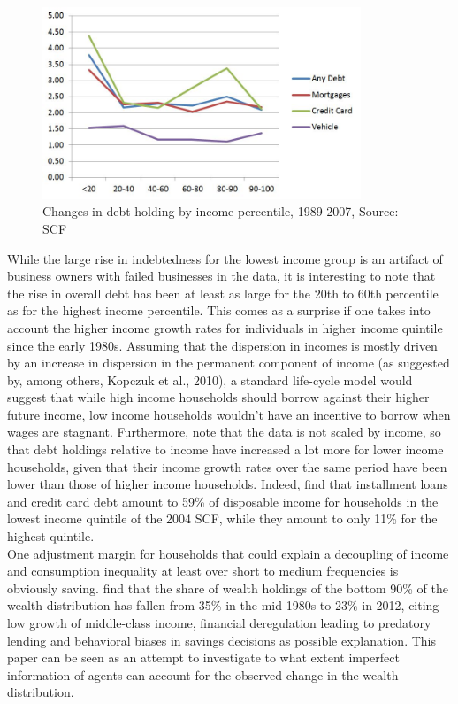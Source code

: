 \begin{figure}[ht]
	\centering
		\includegraphics[width=0.85\textwidth]{chg_debt_scf.JPG}
		\caption{Changes in debt holding by income percentile, 1989-2007, Source: SCF}
	\label{fig:chg_debt_scf}
\end{figure}
While the large rise in indebtedness for the lowest income group is an artifact of business owners with failed businesses in the data, it is interesting to note that the rise in overall debt has been at least as large for the 20th to 60th percentile as for the highest income percentile. This comes as a surprise if one takes into account the higher income growth rates for individuals in higher income quintile since the early 1980s. Assuming that the dispersion in incomes is mostly driven by an increase in dispersion in the permanent component of income (as suggested by, among others, Kopczuk et al., 2010), a standard life-cycle model would suggest that while high income households should borrow against their higher future income, low income households wouldn't have an incentive to borrow when wages are stagnant. Furthermore, note that the data is not scaled by income, so that debt holdings relative to income have increased a lot more for lower income households, given that their income growth rates over the same period have been lower than those of higher income households. Indeed, \citet{BarbaPivetti2009} find that installment loans and credit card debt amount to 59\% of disposable income for households in the lowest income quintile of the 2004 SCF, while they amount to only 11\% for the highest quintile. \\
One adjustment margin for households that could explain a decoupling of income and consumption inequality at least over short to medium frequencies is obviously saving. \citet{SaezZucman2014} find that the share of wealth holdings of the bottom 90\% of the wealth distribution has fallen from 35\% in the mid 1980s to 23\% in 2012, citing low growth of middle-class income, financial deregulation leading to predatory lending and behavioral biases in savings decisions as possible explanation. This paper can be seen as an attempt to investigate to what extent imperfect information of agents can account for the observed change in the wealth distribution.  

